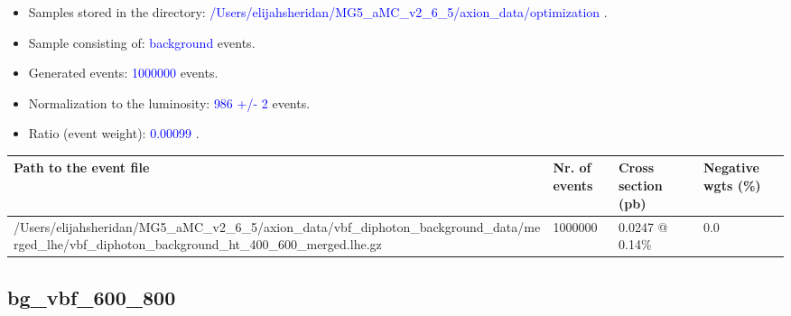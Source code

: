 \documentclass[a4paper, 10pt]{article}
\begin{document}
\begin{itemize}
  \item Samples stored in the directory: \textcolor{blue}{/\-Users/\-elijahsheridan/\-MG5\_aMC\_v2\_6\_5/\-axion\_data/\-optimization} .
   \item Sample consisting of: \textcolor{blue}{background}  events.
   \item Generated events: \textcolor{blue}{1000000 }  events.
   \item Normalization to the luminosity: \textcolor{blue}{986}\textcolor{blue}{ +/\-- }\textcolor{blue}{2 }  events.
   \item Ratio (event weight): \textcolor{blue}{0.00099 } .  
 
\end{itemize}
\begin{table}[H]
  \begin{center}
    \begin{tabular}{|m{55.0mm}|m{25.0mm}|m{30.0mm}|m{30.0mm}|}
      \hline
      {\cellcolor{yellow}         Path to the event file}& {\cellcolor{yellow}         Nr. of events}& {\cellcolor{yellow}         Cross section (pb)}& {\cellcolor{yellow}         Negative wgts (\%)}\\
      \hline
      {\cellcolor{white}          /\-Users/\-elijahsheridan/\-MG5\_aMC\_v2\_6\_5/\-axion\_data/\-vbf\_diphoton\_background\_data/\-merged\_lhe/\-vbf\_diphoton\_background\_ht\_400\_600\_merged.lhe.gz}& {\cellcolor{white}          1000000}& {\cellcolor{white}          0.0247 @ 0.14\%}& {\cellcolor{white}          0.0}\\
\hline
    \end{tabular}
  \end{center}
\end{table}

\subsection{ bg\_vbf\_600\_800}
\end{document}
